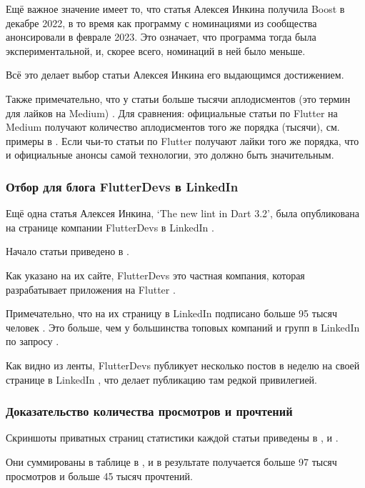 Ещё важное значение имеет то, что статья Алексея Инкина получила Boost в декабре 2022,
в то время как программу с номинациями из сообщества анонсировали в феврале 2023.
Это означает, что программа тогда была экспериментальной, и, скорее всего, номинаций в ней было меньше.

Всё это делает выбор статьи Алексея Инкина его выдающимся достижением.

Также примечательно, что у статьи больше тысячи аплодисментов (это термин для лайков на Medium) .
Для сравнения: официальные статьи по Flutter на Medium получают количество аплодисментов того же порядка (тысячи),
см. примеры в .
Если чьи-то статьи по Flutter получают лайки того же порядка,
что и официальные анонсы самой технологии, это должно быть значительным.


\subsubsection{Отбор для блога FlutterDevs в LinkedIn}

Ещё одна статья Алексея Инкина, `The new lint in Dart 3.2',
была опубликована на странице компании FlutterDevs в LinkedIn .

Начало статьи приведено в .

Как указано на их сайте, FlutterDevs это частная компания,
которая разрабатывает приложения на Flutter .

Примечательно, что на их страницу в LinkedIn подписано больше 95 тысяч человек .
Это больше, чем у большинства топовых компаний и групп в LinkedIn по запросу 
.

Как видно из ленты,
FlutterDevs публикует несколько постов в неделю на своей странице в LinkedIn ,
что делает публикацию там редкой привилегией.


\subsubsection{%
    Доказательство количества просмотров и прочтений%
}

Скриншоты приватных страниц статистики каждой статьи приведены в
,  и .

Они суммированы в таблице в , и в результате получается больше 97 тысяч просмотров и больше 45 тысяч прочтений.

